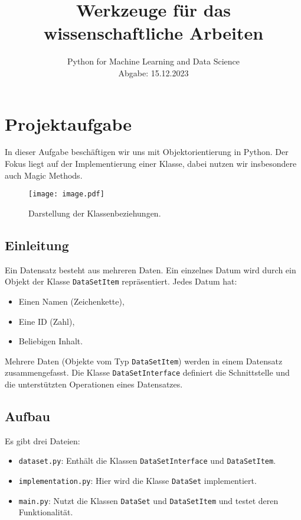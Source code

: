 \documentclass[a4paper,12pt]{article}
\title{Werkzeuge für das wissenschaftliche Arbeiten}
\author{}
\date{Python for Machine Learning and Data Science \\ Abgabe: 15.12.2023}
\begin{document}
\maketitle

\tableofcontents
\newpage

\section{Projektaufgabe}

In dieser Aufgabe beschäftigen wir uns mit Objektorientierung in Python. Der Fokus liegt auf der Implementierung einer Klasse, dabei nutzen wir insbesondere auch Magic Methods.

\begin{figure}[h!]
    \centering
    \texttt{[image: image.pdf]} %
    \caption{Darstellung der Klassenbeziehungen.}
    \label{fig:diagram}
\end{figure}

\subsection{Einleitung}

Ein Datensatz besteht aus mehreren Daten. Ein einzelnes Datum wird durch ein Objekt der Klasse \texttt{DataSetItem} repräsentiert. Jedes Datum hat:
\begin{itemize}
    \item Einen Namen (Zeichenkette),
    \item Eine ID (Zahl),
    \item Beliebigen Inhalt.
\end{itemize}

Mehrere Daten (Objekte vom Typ \texttt{DataSetItem}) werden in einem Datensatz zusammengefasst. Die Klasse \texttt{DataSetInterface} definiert die Schnittstelle und die unterstützten Operationen eines Datensatzes.

\subsection{Aufbau}

Es gibt drei Dateien:
\begin{itemize}
    \item \texttt{dataset.py}: Enthält die Klassen \texttt{DataSetInterface} und \texttt{DataSetItem}.
    \item \texttt{implementation.py}: Hier wird die Klasse \texttt{DataSet} implementiert.
    \item \texttt{main.py}: Nutzt die Klassen \texttt{DataSet} und \texttt{DataSetItem} und testet deren Funktionalität.
\end{itemize}
\end{document}
